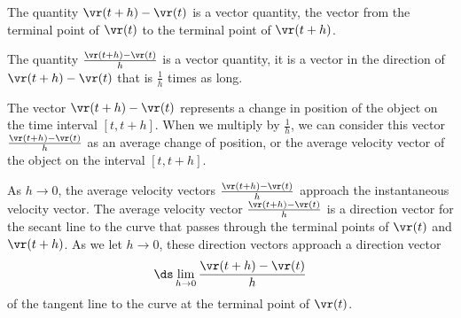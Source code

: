 \begin{smallhint}

\end{smallhint}
\begin{bighint}

\end{bighint}
\begin{activitySolution}
   \ba
    \item The quantity $\vr(t+h)-\vr(t)$ is a vector quantity, the vector from the terminal point of $\vr(t)$ to the terminal point of $\vr(t+h)$.

    \item The quantity $\frac{\vr(t+h)-\vr(t)}{h}$ is a vector quantity, it is a vector in the direction of $\vr(t+h)-\vr(t)$ that is $\frac{1}{h}$ times as long. 

    \item The vector $\vr(t+h)-\vr(t)$ represents a change in position of the object on the time interval $[t, t+h]$. When we multiply by $\frac{1}{h}$, we can consider this vector  $\frac{\vr(t+h)-\vr(t)}{h}$ as an average change of position, or the average velocity vector of the object on the interval $[t,t+h]$. 

    \item As $h \to 0$, the average velocity vectors $\frac{\vr(t+h)-\vr(t)}{h}$ approach the instantaneous velocity vector. The average velocity vector $\frac{\vr(t+h)-\vr(t)}{h}$ is a direction vector for the secant line to the curve that passes through the terminal points of $\vr(t)$ and $\vr(t+h)$. As we let $h \to 0$, these direction vectors approach a direction vector  
        \[\ds \lim_{h \to 0} \frac{\vr(t+h)-\vr(t)}{h}\]
of the tangent line to the curve at the terminal point of $\vr(t)$. 
    \ea

\end{activitySolution}
\aftera
